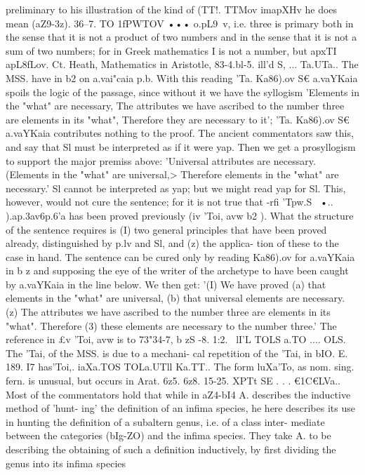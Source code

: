 {{{{{{{{{{{{{{{{{{{{{{{{{{{{{{{{{{{{{{{{{{{{{{{{{{{{{{{{{{{{{{{preliminary to his illustration of the kind of (TT!. TTMov imapXHv
he does mean (aZ9-3z).
36--7. TO 1fPWTOV ••• o.pL9~v, i.e. three is primary both in the
sense that it is not a product of two numbers and in the sense
that it is not a sum of two numbers; for in Greek mathematics
I is not a number, but apxTI apL8fLov. Ct. Heath, Mathematics in
Aristotle, 83-4.bl-5. ill'd S, ... Ta.UTa.. The MSS. have in b2 on a.vai"caia p.b.
With this reading 'Ta. Ka86).ov S€ a.vaYKaia spoils the logic of the
passage, since without it we have the syllogism 'Elements in
the "what" are necessary, The attributes we have ascribed to the
number three are elements in its "what", Therefore they are
necessary to it'; 'Ta. Ka86).ov S€ a.vaYKaia contributes nothing to
the proof. The ancient commentators saw this, and say that Sl
must be interpreted as if it were yap. Then we get a prosyllogism
to support the major premiss above: 'Universal attributes are
necessary. (Elements in the "what" are universal,> Therefore
elements in the "what" are necessary.' Sl cannot be interpreted
as yap; but we might read yap for Sl. This, however, would not
cure the sentence; for it is not true that -rfi 'Tpw.S~ •.. ).ap.{3av6p.6'a
has been proved previously (iv 'Toi, avw b2 ). What the structure of
the sentence requires is (I) two general principles that have been
proved already, distinguished by p.lv and Sl, and (z) the applica-
tion of these to the case in hand. The sentence can be cured only
by reading Ka86).ov for a.vaYKaia in b z and supposing the eye of
the writer of the archetype to have been caught by a.vaYKaia in
the line below. We then get: '(I) We have proved (a) that elements
in the "what" are universal, (b) that universal elements are
necessary. (z) The attributes we have ascribed to the number
three are elements in its "what". Therefore (3) these elements
are necessary to the number three.'
The reference in £v 'Toi, avw is to 73"34-7, b zS -8.
1:2. ~lI'L TOLS a.TO .... OLS. The 'Tai, of the MSS. is due to a mechani-
cal repetition of the 'Tai, in bIO. E. 189. I7 has'Toi,.
iaXa.TOS TOLa.UTll Ka.TT\YOpLa.. The form luXa'To, as nom. sing.
fern. is unusual, but occurs in Arat. 6z5. 6z8.
15-25. XPTt SE . . . €1C€LVa.. Most of the commentators hold
that while in aZ4-bI4 A. describes the inductive method of 'hunt-
ing' the definition of an infima species, he here describes its use
in hunting the definition of a subaltern genus, i.e. of a class inter-
mediate between the categories (bIg-ZO) and the infima species.
They take A. to be describing the obtaining of such a definition
inductively, by first dividing the genus into its infima species
}}}}}}}}}}}}}}}}}}}}}}}}}}}}}}}}}}}}}}}}}}}}}}}}}}}}}}}}}}}}}}}}
